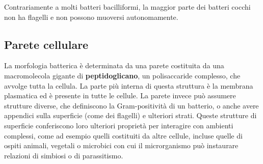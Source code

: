 \documentclass[../main.tex]{subfiles}
\begin{document}
Contrariamente a molti batteri bacilliformi, la maggior parte dei batteri cocchi non ha flagelli e non possono muoversi autonomamente.\cite{levinson_2018}

\subsection{Parete cellulare}

La morfologia batterica è determinata da una parete costituita da una macromolecola gigante di \textbf{peptidoglicano}, un polisaccaride complesso, che avvolge tutta la cellula. La parte più interna di questa struttura è la membrana plasmatica ed è presente in tutte le cellule. La parete invece può assumere strutture diverse, che definiscono la Gram-positività di un batterio, o anche avere appendici sulla superficie (come dei flagelli) e ulteriori strati.  Queste strutture di superficie conferiscono loro ulteriori proprietà per interagire con ambienti complessi, come ad esempio quelli costituiti da altre cellule, incluse quelle di ospiti animali, vegetali o microbici con cui il microrganismo può instaurare relazioni di simbiosi o di parassitismo.\cite{smith_1977}
\end{document}

